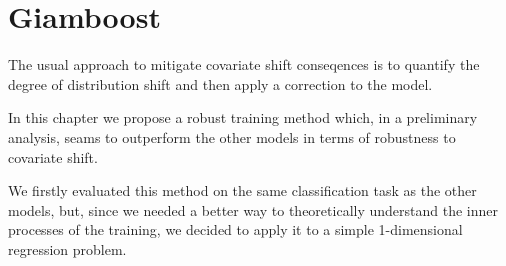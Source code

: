 \chapter{Giamboost}

The usual approach to mitigate covariate shift conseqences is to quantify the degree of distribution shift and then apply a correction to the model.

In this chapter we propose a robust training method which, in a preliminary analysis, seams to outperform the other models in terms of robustness to covariate shift.

We firstly evaluated this method on the same classification task as the other models, but, since we needed a better way to theoretically understand the inner processes of the training, we decided to apply it to a simple 1-dimensional regression problem.